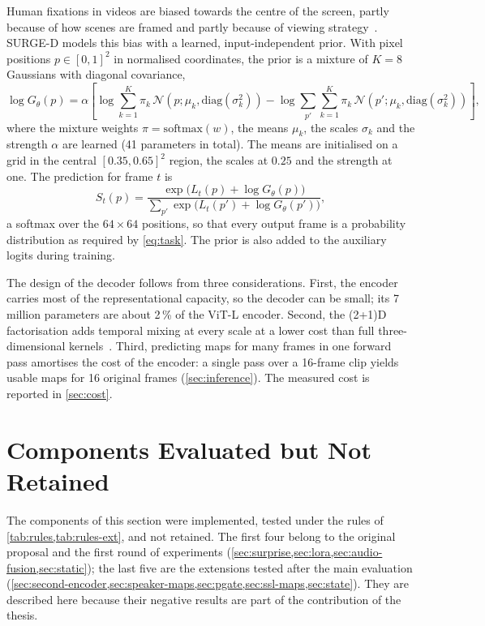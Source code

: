 Human fixations in videos are biased towards the centre of the screen, partly
because of how scenes are framed and partly because of viewing
strategy~\cite{tatler2007central,tseng2009quantifying}. SURGE-D models this
bias with a learned, input-independent prior. With pixel positions
$p\in[0,1]^2$ in normalised coordinates, the prior is a mixture of $K=8$
Gaussians with diagonal covariance,
\begin{equation}
  \log G_\theta(p) = \alpha\left[\log\sum_{k=1}^{K}\pi_k\,
  \mathcal{N}\!\left(p;\mu_k,\mathrm{diag}(\sigma_k^2)\right)
  - \log\sum_{p'}\sum_{k=1}^{K}\pi_k\,\mathcal{N}\!\left(p';\mu_k,\mathrm{diag}(\sigma_k^2)\right)\right],
  \label{eq:prior}
\end{equation}
where the mixture weights $\pi=\mathrm{softmax}(w)$, the means $\mu_k$, the
scales $\sigma_k$ and the strength $\alpha$ are learned (41 parameters in
total). The means are initialised on a grid in the central
$[0.35,0.65]^2$ region, the scales at $0.25$ and the strength at one. The
prediction for frame $t$ is
\begin{equation}
  S_t(p) = \frac{\exp\big(L_t(p)+\log G_\theta(p)\big)}
  {\sum_{p'}\exp\big(L_t(p')+\log G_\theta(p')\big)},
  \label{eq:output}
\end{equation}
a softmax over the $64\times64$ positions, so that every output frame is a
probability distribution as required by \cref{eq:task}. The prior is also
added to the auxiliary logits during training.

The design of the decoder follows from three considerations. First, the
encoder carries most of the representational capacity, so the decoder can be
small; its 7 million parameters are about 2\,\% of the \acrshort{ViT}-L encoder.
Second, the (2+1)D factorisation adds temporal mixing at every scale at a
lower cost than full three-dimensional kernels~\cite{tran2018closer}. Third,
predicting maps for many frames in one forward pass amortises the cost of the
encoder: a single pass over a 16-frame clip yields usable maps for 16 original
frames (\cref{sec:inference}). The measured cost is reported in
\cref{sec:cost}.

\section{Components Evaluated but Not Retained}\label{sec:optional}

The components of this section were implemented, tested under the rules of
\cref{tab:rules,tab:rules-ext}, and not retained. The first four belong to the original
proposal and the first round of experiments
(\cref{sec:surprise,sec:lora,sec:audio-fusion,sec:static}); the last five are
the extensions tested after the main evaluation
(\cref{sec:second-encoder,sec:speaker-maps,sec:pgate,sec:ssl-maps,sec:state}). They are
described here because their negative results are part of the contribution of
the thesis.

